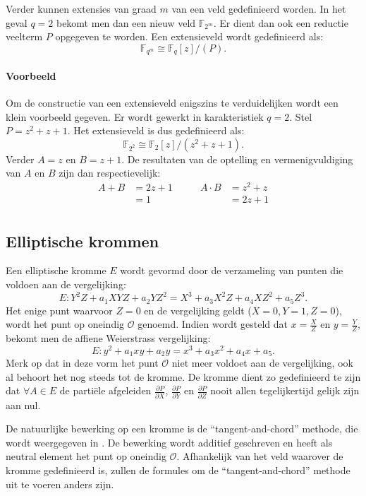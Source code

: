 Verder kunnen extensies van graad $m$ van een veld gedefinieerd worden. In het geval $q = 2$ bekomt men dan een nieuw veld $\mathbb{F}_{2^m}$. Er dient dan ook een reductie veelterm $P$ opgegeven te worden. Een extensieveld wordt gedefinieerd als:
\[\mathbb{F}_{q^m} \cong \mathbb{F}_q [z] / (P). \]

\paragraph{Voorbeeld} Om de constructie van een extensieveld enigszins te verduidelijken wordt een klein voorbeeld gegeven. Er wordt gewerkt in karakteristiek $q = 2$. Stel $P = z^2 + z + 1$. Het extensieveld is dus gedefinieerd als:
\[\mathbb{F}_{2^2} \cong \mathbb{F}_2 [z] / (z^2 + z + 1). \]
Verder $A = z$ en $B = z + 1$. De resultaten van de optelling en vermenigvuldiging van $A$ en $B$ zijn dan respectievelijk:
\[\begin{aligned}
A + B &= 2z + 1 \qquad & A \cdot B &= z^2 + z\\
&= 1	& &= 2z + 1\\
\end{aligned}\]

\subsection{Elliptische krommen}

Een elliptische kromme $E$ wordt gevormd door de verzameling van punten die voldoen aan de vergelijking:
\[E: Y^2 Z + a_1 XYZ + a_2 Y Z^2 = X^3 + a_3 X^2 Z + a_4 X Z^2 + a_5 Z^3.\]
Het enige punt waarvoor $Z = 0$ en de vergelijking geldt ($X = 0,  Y = 1, Z = 0$), wordt het punt op oneindig $\mathcal{O}$ genoemd. Indien wordt gesteld dat $x = \frac{X}{Z}$ en $y = \frac{Y}{Z}$, bekomt men de affiene Weierstrass vergelijking:
\[E: y^2 + a_1 xy + a_2 y = x^3 + a_3 x^2 + a_4 x + a_5.\]
Merk op dat in deze vorm het punt $\mathcal{O}$ niet meer voldoet aan de vergelijking, ook al behoort het nog steeds tot de kromme. De kromme dient zo gedefinieerd te zijn dat $\forall A \in E$ de parti\"ele afgeleiden $\frac{\partial P}{\partial X}$, $\frac{\partial P}{\partial Y}$ en $\frac{\partial P}{\partial Z}$ nooit allen tegelijkertijd gelijk zijn aan nul.

De natuurlijke bewerking op een kromme is de ``tangent-and-chord'' methode, die wordt weergegeven in . De bewerking wordt additief geschreven en heeft als neutral element het punt op oneindig $\mathcal{O}$. Afhankelijk van het veld waarover de kromme gedefinieerd is, zullen de formules om de ``tangent-and-chord'' methode uit te voeren anders zijn. 

